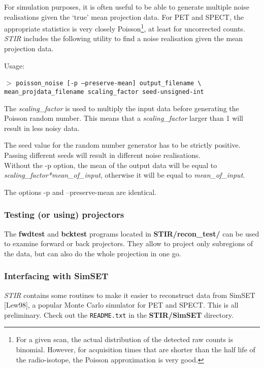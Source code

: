 \documentclass{article}
\newcommand{\cmdline}[1]{\par \noindent $>$ \texttt{#1}\par}
\begin{document}
For simulation purposes, it is often useful to be able to generate 
multiple noise realisations given the `true' mean projection data. 
For PET and SPECT, the appropriate statistics is very closely 
Poisson\footnote{{\small For a given scan, the actual distribution of 
the detected raw counts is binomial. However, for acquisition 
times that are shorter than the half life of the radio-isotope, 
the Poisson approximation is very good.}}, 
at least for uncorrected counts. \textit{STIR} includes the following 
utility to find a noise realisation given the mean projection 
data.


Usage:
\cmdline{poisson\_noise [-p {\textbar} --preserve-mean] output\_filename 
{\textbackslash}\\
mean\_projdata\_filename scaling\_factor seed-unsigned-int}


The \textit{scaling\_factor} is used to multiply the input data before 
generating the Poisson random number. This means that a \textit{scaling\_factor} 
larger than 1 will result in less noisy data.


The seed value for the random number generator has to be strictly 
positive. Passing different seeds will result in different noise 
realisations.\\
Without the -p option, the mean of the output data will be equal 
to \textit{scaling\_factor*mean\_of\_input}, otherwise it will be equal 
to \textit{mean\_of\_input}.


The options -p and --preserve-mean are identical.


\subsubsection{
Testing (or using) projectors}

The \textbf{fwdtest} and \textbf{bcktest} programs located in \textbf{STIR/recon\_test/} can 
be used to examine forward or back projectors. They allow to 
project only subregions of the data, but can also do the whole 
projection in one go. 


\subsubsection{
Interfacing with SimSET}
\textit{STIR} contains some routines to make it easier to reconstruct data from SimSET [Lew98], 
a popular Monte Carlo simulator for PET and SPECT. This
is all preliminary. Check out the \texttt{README.txt} in the \textbf{STIR/SimSET} directory.
\end{document}
